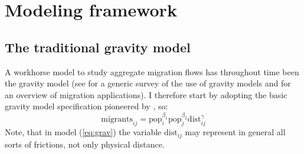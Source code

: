 \documentclass[fleqn,10pt]{SelfArx} %
\begin{document}
        \section{Modeling framework}

        \subsection{The traditional gravity model}

        A workhorse model to study aggregate migration flows has throughout time been the gravity model (see \citet{anderson2011gravity} for a generic survey of the use of gravity models and \citet{poot2016gravity} for an overview of migration applications). I therefore start by adopting the basic gravity model specification pioneered by
        \citet{tinbergen1962shaping}, so:
        \begin{equation}
          \text{migrants}_{ij} = \text{pop}_i^{\beta_1}\text{pop}_j^{\beta_2}\text{dist}_{ij}^\gamma
          \label{eq:grav}
        \end{equation}
        Note, that in model (\ref{eq:grav}) the variable
        $\text{dist}_{ij}$ may represent in general all sorts of frictions, not
        only physical distance.
        
\end{document}
